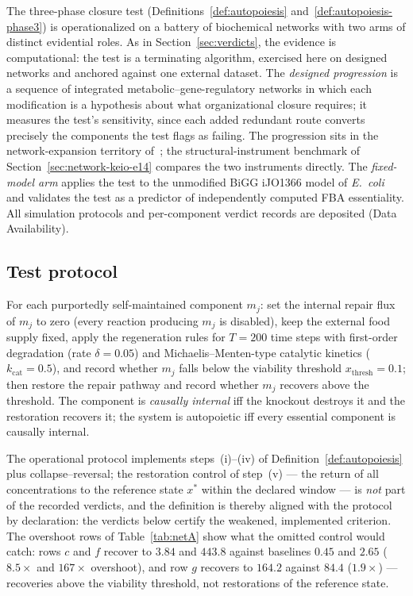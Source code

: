 \documentclass[11pt,a4paper]{article}
\theoremstyle{plain}
\theoremstyle{definition}
\theoremstyle{remark}
\begin{document}
The three-phase closure test (Definitions~\ref{def:autopoiesis}
and~\ref{def:autopoiesis-phase3}) is operationalized on a battery
of biochemical networks with two arms of distinct evidential roles.
As in Section~\ref{sec:verdicts}, the evidence is computational:
the test is a terminating algorithm, exercised here on designed
networks and anchored against one external dataset. The
\emph{designed progression} is a sequence of integrated
metabolic--gene-regulatory networks in which each modification is
a hypothesis about what organizational closure requires; it
measures the test's sensitivity, since each added redundant route
converts precisely the components the test flags as failing. The
progression sits in the network-expansion territory
of~\citet{handorf2005network}; the structural-instrument benchmark
of Section~\ref{sec:network-keio-e14} compares the two instruments
directly. The
\emph{fixed-model arm} applies the test to the unmodified BiGG
iJO1366 model of \emph{E.~coli}~\cite{orth2011} and validates the
test as a predictor of independently computed FBA essentiality.
All simulation protocols and per-component verdict records are
deposited (Data Availability).

\subsection{Test protocol}

For each purportedly self-maintained component $m_j$: set the
internal repair flux of $m_j$ to zero (every reaction producing
$m_j$ is disabled), keep the external food supply fixed, apply the
regeneration rules for $T=200$ time steps with first-order
degradation (rate $\delta=0.05$) and Michaelis--Menten-type
catalytic kinetics ($k_{\mathrm{cat}}=0.5$), and record whether
$m_j$ falls below the viability threshold
$x_{\mathrm{thresh}}=0.1$; then restore the repair pathway and
record whether $m_j$ recovers above the threshold. The component
is \emph{causally internal} iff the knockout destroys it and the
restoration recovers it; the system is autopoietic iff every
essential component is causally internal.

The operational protocol implements steps~(i)--(iv) of
Definition~\ref{def:autopoiesis} plus collapse--reversal; the
restoration control of step~(v) --- the return of all concentrations
to the reference state $x^{*}$ within the declared window --- is
\emph{not} part of the recorded verdicts, and the definition is
thereby aligned with the protocol by declaration: the verdicts
below certify the weakened, implemented criterion. The overshoot
rows of Table~\ref{tab:netA} show what the omitted control would
catch: rows $c$ and $f$ recover to $3.84$ and $443.8$ against
baselines $0.45$ and $2.65$ ($8.5\times$ and $167\times$
overshoot), and row $g$ recovers to $164.2$ against $84.4$
($1.9\times$) --- recoveries above the viability threshold, not
restorations of the reference state.
\end{document}
